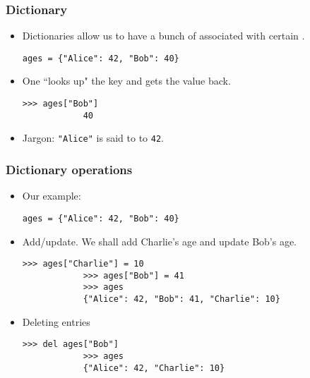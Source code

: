 \documentclass[notes]{beamer}
\begin{document}
	\begin{frame}[fragile]
		\frametitle{Dictionary}
		
		\begin{itemize}
			\item Dictionaries allow us to have a bunch of  associated with certain .
			\begin{lstlisting}[xleftmargin=\dimexpr-\leftmargini]
			ages = {"Alice": 42, "Bob": 40}
			\end{lstlisting}
			
			\item One ``looks up" the key and gets the value back.
			\begin{lstlisting}[xleftmargin=\dimexpr-\leftmargini]
			>>> ages["Bob"]
			40\end{lstlisting}
			
			\item Jargon: \lstinline|"Alice"| is said to  to \lstinline|42|.
			
			
		\end{itemize}
	\end{frame}
	
	\begin{frame}[fragile]
		\frametitle{Dictionary operations}
		
		\begin{itemize}
			\item Our example:
			\begin{lstlisting}[xleftmargin=\dimexpr-\leftmargini]
			ages = {"Alice": 42, "Bob": 40}
			\end{lstlisting}
			\item Add/update. We shall add Charlie's age and update Bob's age.
			\begin{lstlisting}[xleftmargin=\dimexpr-\leftmargini]
			>>> ages["Charlie"] = 10
			>>> ages["Bob"] = 41
			>>> ages
			{"Alice": 42, "Bob": 41, "Charlie": 10}
			\end{lstlisting}
			
			\item Deleting entries
			\begin{lstlisting}[xleftmargin=\dimexpr-\leftmargini]
			>>> del ages["Bob"]
			>>> ages
			{"Alice": 42, "Charlie": 10}
			\end{lstlisting}
			
		\end{itemize}
	\end{frame}
	
\end{document}
